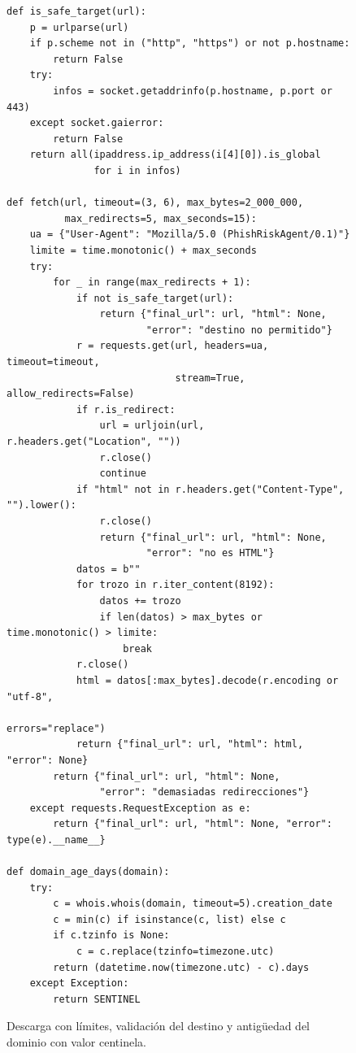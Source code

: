 \begin{figure}[ht]
\begin{lstlisting}
def is_safe_target(url):
    p = urlparse(url)
    if p.scheme not in ("http", "https") or not p.hostname:
        return False
    try:
        infos = socket.getaddrinfo(p.hostname, p.port or 443)
    except socket.gaierror:
        return False
    return all(ipaddress.ip_address(i[4][0]).is_global
               for i in infos)

def fetch(url, timeout=(3, 6), max_bytes=2_000_000,
          max_redirects=5, max_seconds=15):
    ua = {"User-Agent": "Mozilla/5.0 (PhishRiskAgent/0.1)"}
    limite = time.monotonic() + max_seconds
    try:
        for _ in range(max_redirects + 1):
            if not is_safe_target(url):
                return {"final_url": url, "html": None,
                        "error": "destino no permitido"}
            r = requests.get(url, headers=ua, timeout=timeout,
                             stream=True, allow_redirects=False)
            if r.is_redirect:
                url = urljoin(url, r.headers.get("Location", ""))
                r.close()
                continue
            if "html" not in r.headers.get("Content-Type", "").lower():
                r.close()
                return {"final_url": url, "html": None,
                        "error": "no es HTML"}
            datos = b""
            for trozo in r.iter_content(8192):
                datos += trozo
                if len(datos) > max_bytes or time.monotonic() > limite:
                    break
            r.close()
            html = datos[:max_bytes].decode(r.encoding or "utf-8",
                                            errors="replace")
            return {"final_url": url, "html": html, "error": None}
        return {"final_url": url, "html": None,
                "error": "demasiadas redirecciones"}
    except requests.RequestException as e:
        return {"final_url": url, "html": None, "error": type(e).__name__}

def domain_age_days(domain):
    try:
        c = whois.whois(domain, timeout=5).creation_date
        c = min(c) if isinstance(c, list) else c
        if c.tzinfo is None:
            c = c.replace(tzinfo=timezone.utc)
        return (datetime.now(timezone.utc) - c).days
    except Exception:
        return SENTINEL
\end{lstlisting}
\caption{Descarga con límites, validación del destino y antigüedad del dominio con valor centinela.}
\label{lst:extraccion}
\end{figure}


